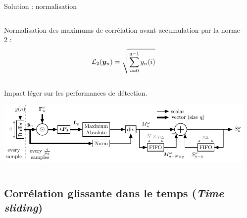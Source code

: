 \documentclass[../main.tex]{subfiles}
\begin{document}
\begin{frame}{Solution : normalisation}
  \begin{columns}
    \begin{column}{.5\linewidth}
      \centering
      Normalisation des maximums de corrélation avant accumulation par la norme-2 : $$\mathcal{L}_{2}(\bm{y}_n) = \sqrt{\sum_{i = 0}^{q - 1} y_n(i)}$$\\
      Impact léger sur les performances de détection\footnotemark.

      \vspace*{1 em}

      \includegraphics[width=\linewidth]{figures/tikzpicture/score_proc_unit_stdl.pdf}
    \end{column}
    \begin{column}{.5\linewidth}
      \begin{overlayarea}{\linewidth}{.85\textheight}
      \end{overlayarea}
    \end{column}
  \end{columns}
\end{frame}



\subsection{Corrélation glissante dans le temps (\emph{Time sliding})}
\end{document}
